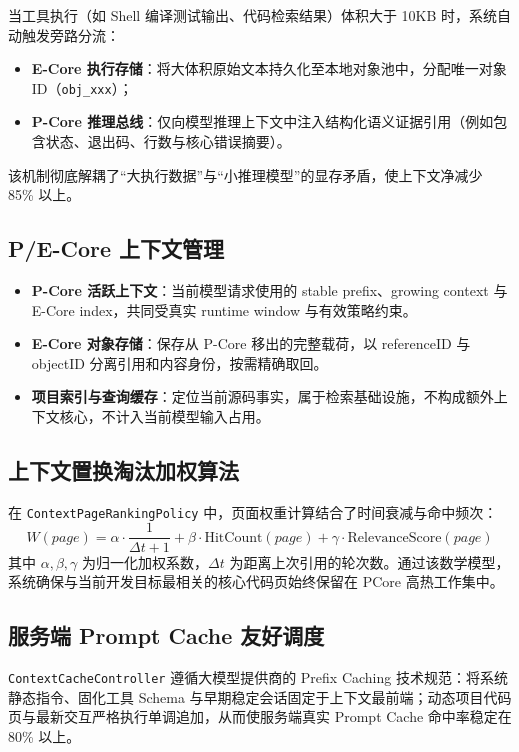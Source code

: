 \documentclass[11pt,a4paper]{article}
\begin{document}
当工具执行（如 Shell 编译测试输出、代码检索结果）体积大于 10KB 时，系统自动触发旁路分流：
\begin{itemize}
    \item \textbf{E-Core 执行存储}：将大体积原始文本持久化至本地对象池中，分配唯一对象 ID（\texttt{obj\_xxx}）；
    \item \textbf{P-Core 推理总线}：仅向模型推理上下文中注入结构化语义证据引用（例如包含状态、退出码、行数与核心错误摘要）。
\end{itemize}
该机制彻底解耦了“大执行数据”与“小推理模型”的显存矛盾，使上下文净减少 85\% 以上。

\subsection{P/E-Core 上下文管理}
\begin{itemize}
    \item \textbf{P-Core 活跃上下文}：当前模型请求使用的 stable prefix、growing context 与 E-Core index，共同受真实 runtime window 与有效策略约束。
    \item \textbf{E-Core 对象存储}：保存从 P-Core 移出的完整载荷，以 referenceID 与 objectID 分离引用和内容身份，按需精确取回。
    \item \textbf{项目索引与查询缓存}：定位当前源码事实，属于检索基础设施，不构成额外上下文核心，不计入当前模型输入占用。
\end{itemize}

\subsection{上下文置换淘汰加权算法}
在 \texttt{ContextPageRankingPolicy} 中，页面权重计算结合了时间衰减与命中频次：
\begin{equation}
W(page) = \alpha \cdot \frac{1}{\Delta t + 1} + \beta \cdot \text{HitCount}(page) + \gamma \cdot \text{RelevanceScore}(page)
\end{equation}
其中 $\alpha, \beta, \gamma$ 为归一化加权系数，$\Delta t$ 为距离上次引用的轮次数。通过该数学模型，系统确保与当前开发目标最相关的核心代码页始终保留在 PCore 高热工作集中。

\subsection{服务端 Prompt Cache 友好调度}
\texttt{ContextCacheController} 遵循大模型提供商的 Prefix Caching 技术规范：将系统静态指令、固化工具 Schema 与早期稳定会话固定于上下文最前端；动态项目代码页与最新交互严格执行单调追加，从而使服务端真实 Prompt Cache 命中率稳定在 80\% 以上。
\end{document}
